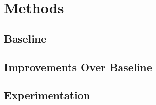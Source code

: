 \section*{Methods}

\subsection*{Baseline}

\subsection*{Improvements Over Baseline}

\subsection*{Experimentation}
